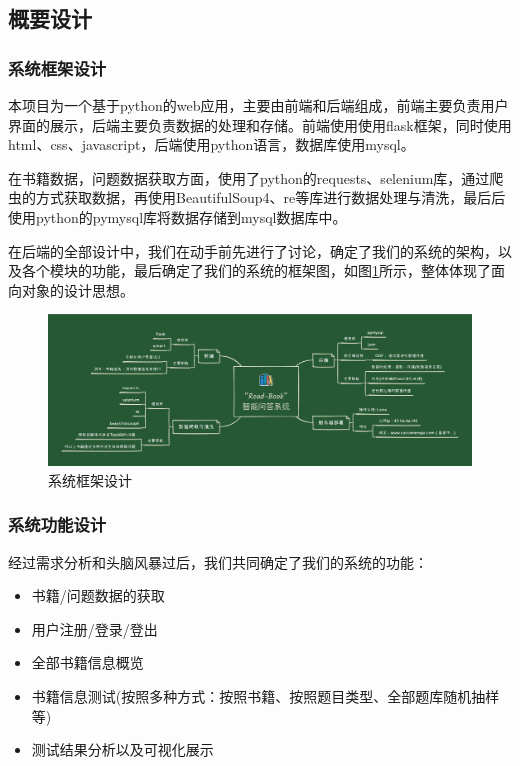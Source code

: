 \documentclass[twoside,11pt]{article}
\begin{document}
\subsection{概要设计}
\subsubsection{系统框架设计}

本项目为一个基于python的web应用，主要由前端和后端组成，前端主要负责用户界面的展示，后端主要负责数据的处理和存储。前端使用使用flask框架，同时使用html、css、javascript，后端使用python语言，数据库使用mysql。

在书籍数据，问题数据获取方面，使用了python的requests、selenium库，通过爬虫的方式获取数据，再使用BeautifulSoup4、re等库进行数据处理与清洗，最后后使用python的pymysql库将数据存储到mysql数据库中。

在后端的全部设计中，我们在动手前先进行了讨论，确定了我们的系统的架构，以及各个模块的功能，最后确定了我们的系统的框架图，如图\ref{fig:fig1}所示，整体体现了面向对象的设计思想。

\begin{figure}[H]
    \centering
    \includegraphics[width=1\columnwidth]{figures/系统框架设计.jpg}
    \caption{系统框架设计}
    \label{fig:fig1}
\end{figure}
\subsubsection{系统功能设计}

经过需求分析和头脑风暴过后，我们共同确定了我们的系统的功能：
\begin{itemize}
    \item 书籍/问题数据的获取
    \item 用户注册/登录/登出
    \item 全部书籍信息概览
    \item 书籍信息测试(按照多种方式：按照书籍、按照题目类型、全部题库随机抽样等)
    \item 测试结果分析以及可视化展示
\end{itemize}
\end{document}
